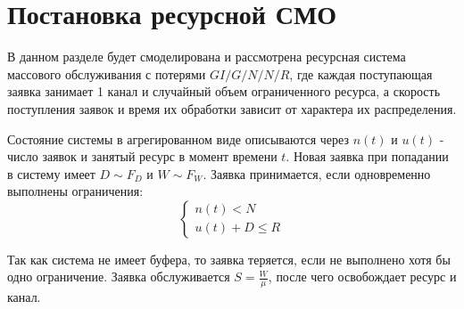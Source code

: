 \label {ch:model_and_methods}

\section{Постановка ресурсной СМО}
\label{sec:formal_model}

В данном разделе будет смоделирована и рассмотрена ресурсная система  массового обслуживания с потерями $GI/G/N/N/R$, где каждая поступающая заявка занимает 1 канал и случайный объем ограниченного ресурса, а скорость поступления заявок и время их обработки зависит от характера их распределения\cite{naumov_total_resources_2016,naumov_samouylov_multiresource_loss_2017}. 



Состояние системы в агрегированном виде описываются через $n(t)$ и $u(t)$ - число заявок и занятый ресурс в момент времени $t$. Новая заявка при попадании в систему имеет $D \sim F_D$ и $W \sim F_W$. Заявка принимается, если одновременно выполнены ограничения:
$$
\begin{cases}
    n(t) < N \\
    u(t) + D \leq R
\end{cases}
$$

Так как система не имеет буфера, то заявка теряется, если не выполнено хотя бы одно ограничение. Заявка обслуживается $S=\frac{W}{\mu}$, после чего освобождает ресурс и канал. 


